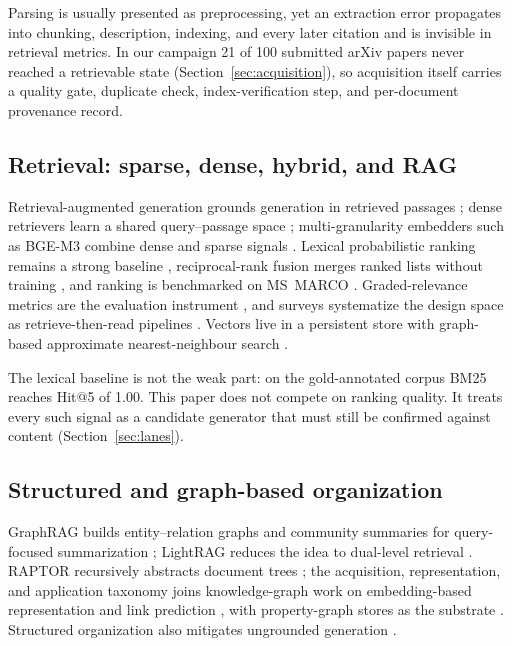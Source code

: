Parsing is usually presented as preprocessing, yet an extraction error
propagates into chunking, description, indexing, and every later citation and is
invisible in retrieval metrics. In our campaign 21 of 100 submitted arXiv papers
never reached a retrievable state (Section~\ref{sec:acquisition}), so
acquisition itself carries a quality gate, duplicate check, index-verification
step, and per-document provenance record.

\subsection{Retrieval: sparse, dense, hybrid, and RAG}
Retrieval-augmented generation grounds generation in retrieved passages
\citep{rag-lewis}; dense retrievers learn a shared query--passage space
\citep{dpr}; multi-granularity embedders such as BGE-M3 combine dense and sparse
signals \citep{bge-m3}. Lexical probabilistic ranking remains a strong baseline
\citep{bm25}, reciprocal-rank fusion merges ranked lists without training
\citep{rrf-cormack}, and ranking is benchmarked on MS~MARCO
\citep{craswell-msmarco-2021}. Graded-relevance metrics are the evaluation
instrument \citep{jarvelin-cumulated-gain-2002}, and surveys systematize the
design space as retrieve-then-read pipelines \citep{gao-ragsurvey}. Vectors live
in a persistent store with graph-based approximate nearest-neighbour search
\citep{chroma,hnsw}.

The lexical baseline is not the weak part: on the gold-annotated corpus BM25
reaches Hit@5 of 1.00. This paper does not compete on ranking quality. It treats
every such signal as a candidate generator that must still be confirmed against
content (Section~\ref{sec:lanes}).

\subsection{Structured and graph-based organization}
GraphRAG builds entity--relation graphs and community summaries for
query-focused summarization \citep{graphrag}; LightRAG reduces the idea to
dual-level retrieval \citep{lightrag}. RAPTOR recursively abstracts document
trees \citep{raptor}; the acquisition, representation, and application taxonomy
\citep{ji-kg-survey-2022} joins knowledge-graph work on embedding-based
representation and link prediction \citep{wang-kg-embedding-2017}, with
property-graph stores as the substrate \citep{neo4j}. Structured organization
also mitigates ungrounded generation \citep{siren}.

